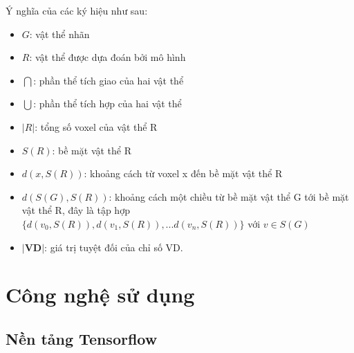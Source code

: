 Ý nghĩa của các ký hiệu như sau:
\begin{itemize}
    \item $G$: vật thể nhãn
    \item $R$: vật thể được dựa đoán bởi mô hình
    \item $\bigcap$: phần thể tích giao của hai vật thể
    \item $\bigcup$: phần thể tích hợp của hai vật thể
    \item $|R|$: tổng số voxel của vật thể R
    \item $S(R)$: bề mặt vật thể R
    \item $d(x,S(R))$: khoảng cách từ voxel x đến bề mặt vật thể R
    \item $d(S(G),S(R))$: khoảng cách một chiều từ bề mặt vật thể G tới bề mặt vật thể R, đây là tập hợp $\{ d(v_{0}, S(R)), d(v_{1}, S(R)),...d(v_{n}, S(R)) \} $ với $v \in S(G) $
    \item $\textbf{|VD|}$: giá trị tuyệt đối của chỉ số VD.
\end{itemize}

\section{Công nghệ sử dụng}
\subsection{Nền tảng Tensorflow}